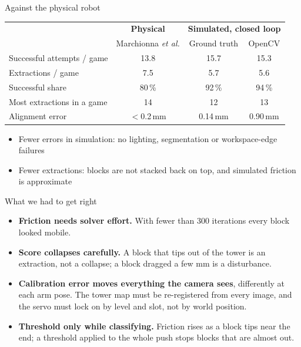 \documentclass[aspectratio=169,11pt,t]{beamer}
\begin{document}
\begin{frame}{Against the physical robot}
\vspace{0.5em}
\centering
\begin{tabular}{@{}lccc@{}}
\toprule
 & \textbf{Physical} & \multicolumn{2}{c}{\textbf{Simulated, closed loop}} \\
 & Marchionna \emph{et al.} & Ground truth & OpenCV \\
\midrule
Successful attempts / game & 13.8 & 15.7 & 15.3 \\
Extractions / game & 7.5 & 5.7 & 5.6 \\
Successful share & 80\,\% & 92\,\% & 94\,\% \\
Most extractions in a game & 14 & 12 & 13 \\
Alignment error & $<$0.2\,mm & 0.14\,mm & 0.90\,mm \\
\bottomrule
\end{tabular}
\vspace{1.2em}
\begin{itemize}
\item Fewer errors in simulation: no lighting, segmentation or workspace-edge failures
\item Fewer extractions: blocks are not stacked back on top, and simulated friction is approximate
\end{itemize}
\end{frame}

\begin{frame}{What we had to get right}
\begin{itemize}
\item \textbf{Friction needs solver effort.} With fewer than 300 iterations every block looked mobile.
\item \textbf{Score collapses carefully.} A block that tips out of the tower is an extraction,
not a collapse; a block dragged a few mm is a disturbance.
\item \textbf{Calibration error moves everything the camera sees}, differently at each arm
pose. The tower map must be re-registered from every image, and the servo must lock
on by level and slot, not by world position.
\item \textbf{Threshold only while classifying.} Friction rises as a block tips near the end;
a threshold applied to the whole push stops blocks that are almost out.
\end{itemize}
\end{frame}
\end{document}
